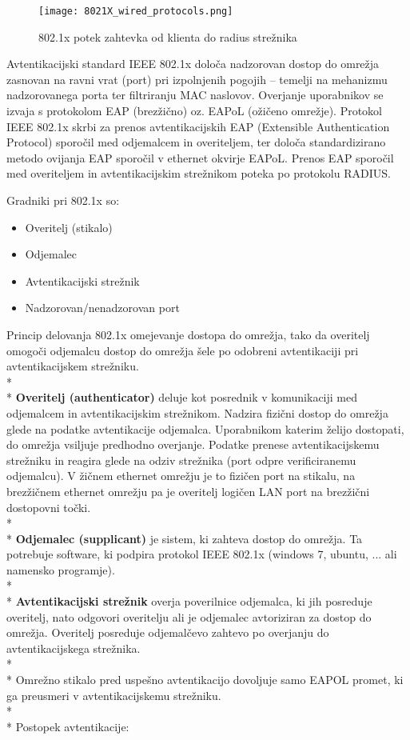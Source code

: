 \documentclass[12pt]{article}
\begin{document}
\begin{figure}[htb]
\begin{center}
\texttt{[image: 8021X\_wired\_protocols.png]}
\end{center}
\caption{802.1x potek zahtevka od klienta do radius strežnika}
\label{802.1x}
\end{figure}

Avtentikacijski standard IEEE 802.1x določa nadzorovan dostop do omrežja zasnovan na ravni vrat (port) pri izpolnjenih pogojih – temelji na mehanizmu nadzorovanega porta ter filtriranju MAC naslovov.
Overjanje uporabnikov se izvaja s protokolom EAP (brezžično) oz. EAPoL (ožičeno omrežje). Protokol IEEE 802.1x skrbi za prenos avtentikacijskih EAP (Extensible Authentication Protocol) sporočil med odjemalcem in overiteljem, ter določa standardizirano metodo ovijanja EAP sporočil v ethernet okvirje EAPoL. Prenos EAP sporočil  med overiteljem in avtentikacijskim strežnikom poteka po protokolu RADIUS.

Gradniki pri 802.1x so:

\begin{itemize}
    \item Overitelj (stikalo)
    \item Odjemalec
    \item Avtentikacijski strežnik  
    \item Nadzorovan/nenadzorovan port
\end{itemize}
 
Princip delovanja 802.1x omejevanje dostopa do omrežja, tako da overitelj omogoči odjemalcu dostop do omrežja šele po odobreni avtentikaciji pri avtentikacijskem strežniku. 
\\*
\\* \indent
\textbf{Overitelj (authenticator)} deluje kot posrednik v komunikaciji med odjemalcem in avtentikacijskim strežnikom. Nadzira fizični dostop do omrežja glede na podatke avtentikacije odjemalca. Uporabnikom katerim želijo dostopati, do omrežja vsiljuje predhodno overjanje. Podatke prenese avtentikacijskemu strežniku in reagira glede na odziv strežnika (port odpre verificiranemu odjemalcu). V žičnem ethernet omrežju je to fizičen port na stikalu, na brezžičnem ethernet omrežju pa je overitelj logičen LAN port na brezžični dostopovni točki.
\\*
\\* \indent
\textbf{Odjemalec (supplicant)} je sistem, ki zahteva dostop do omrežja. Ta potrebuje software, ki podpira protokol IEEE 802.1x (windows 7, ubuntu, ... ali namensko programje).
\\*
\\* \indent
\textbf{Avtentikacijski strežnik} overja poverilnice odjemalca, ki jih posreduje overitelj, nato odgovori overitelju ali je odjemalec avtoriziran za dostop do omrežja. Overitelj posreduje odjemalčevo zahtevo po overjanju do avtentikacijskega strežnika.
\\*
\\* \indent
Omrežno stikalo pred uspešno avtentikacijo dovoljuje samo EAPOL promet, ki ga preusmeri v avtentikacijskemu strežniku.
\\*
\\*
Postopek avtentikacije:
\end{document}
